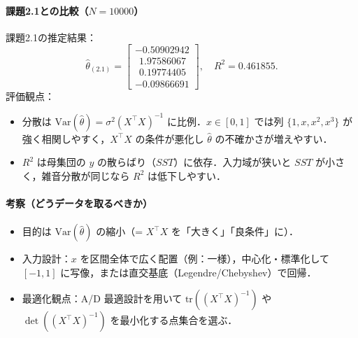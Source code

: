 \paragraph{課題2.1との比較（$N=10000$）}
課題2.1の推定結果：
\[
\hat\theta_{(2.1)}=
\begin{bmatrix}
-0.50902942\\
\ \ 1.97586067\\
\ \ 0.19774405\\
-0.09866691
\end{bmatrix},\quad
R^2=0.461855.
\]
評価観点：
\begin{itemize}\setlength{\itemsep}{0pt}
\item 分散は $\mathrm{Var}(\hat\theta)=\sigma^2(X^\top X)^{-1}$ に比例．$x\in[0,1]$ では列 $\{1,x,x^2,x^3\}$ が強く相関しやすく，$X^\top X$ の条件が悪化し $\hat\theta$ の不確かさが増えやすい．
\item $R^2$ は母集団の $y$ の散らばり（$SST$）に依存．入力域が狭いと $SST$ が小さく，雑音分散が同じなら $R^2$ は低下しやすい．
\end{itemize}

\paragraph{考察（どうデータを取るべきか）}
\begin{itemize}\setlength{\itemsep}{0pt}
\item 目的は $\mathrm{Var}(\hat\theta)$ の縮小（= $X^\top X$ を「大きく」「良条件」に）．
\item 入力設計：$x$ を区間全体で広く配置（例：一様），中心化・標準化して $[-1,1]$ に写像，または直交基底（Legendre/Chebyshev）で回帰．
\item 最適化観点：A/D 最適設計を用いて $\mathrm{tr}((X^\top X)^{-1})$ や $\det((X^\top X)^{-1})$ を最小化する点集合を選ぶ．
\end{itemize}
